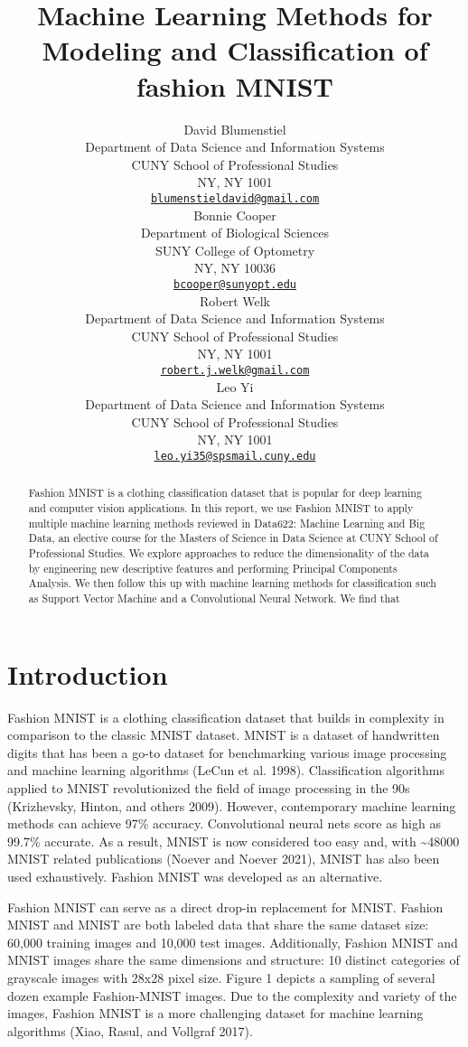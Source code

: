 \documentclass{article}
\title{Machine Learning Methods for Modeling and Classification of
fashion MNIST}
\author{
    David Blumenstiel
   \\
    Department of Data Science and Information Systems \\
    CUNY School of Professional Studies \\
  NY, NY 1001 \\
  \texttt{\href{mailto:blumenstieldavid@gmail.com}{\nolinkurl{blumenstieldavid@gmail.com}}} \\
   \And
    Bonnie Cooper
   \\
    Department of Biological Sciences \\
    SUNY College of Optometry \\
  NY, NY 10036 \\
  \texttt{\href{mailto:bcooper@sunyopt.edu}{\nolinkurl{bcooper@sunyopt.edu}}} \\
   \And
    Robert Welk
   \\
    Department of Data Science and Information Systems \\
    CUNY School of Professional Studies \\
  NY, NY 1001 \\
  \texttt{\href{mailto:robert.j.welk@gmail.com}{\nolinkurl{robert.j.welk@gmail.com}}} \\
   \And
    Leo Yi
   \\
    Department of Data Science and Information Systems \\
    CUNY School of Professional Studies \\
  NY, NY 1001 \\
  \texttt{\href{mailto:leo.yi35@spsmail.cuny.edu}{\nolinkurl{leo.yi35@spsmail.cuny.edu}}} \\
  }
\begin{document}
\maketitle

\def\tightlist{}


\begin{abstract}
Fashion MNIST is a clothing classification dataset that is popular for
deep learning and computer vision applications. In this report, we use
Fashion MNIST to apply multiple machine learning methods reviewed in
Data622: Machine Learning and Big Data, an elective course for the
Masters of Science in Data Science at CUNY School of Professional
Studies. We explore approaches to reduce the dimensionality of the data
by engineering new descriptive features and performing Principal
Components Analysis. We then follow this up with machine learning
methods for classification such as Support Vector Machine and a
Convolutional Neural Network. We find that
\end{abstract}


\hypertarget{introduction}{%
\section{Introduction}\label{introduction}}

Fashion MNIST is a clothing classification dataset that builds in
complexity in comparison to the classic MNIST dataset. MNIST is a
dataset of handwritten digits that has been a go-to dataset for
benchmarking various image processing and machine learning algorithms
(LeCun et al. 1998). Classification algorithms applied to MNIST
revolutionized the field of image processing in the 90s (Krizhevsky,
Hinton, and others 2009). However, contemporary machine learning methods
can achieve 97\% accuracy. Convolutional neural nets score as high as
99.7\% accurate. As a result, MNIST is now considered too easy and, with
\textasciitilde48000 MNIST related publications (Noever and Noever
2021), MNIST has also been used exhaustively. Fashion MNIST was
developed as an alternative.

Fashion MNIST can serve as a direct drop-in replacement for MNIST.
Fashion MNIST and MNIST are both labeled data that share the same
dataset size: 60,000 training images and 10,000 test images.
Additionally, Fashion MNIST and MNIST images share the same dimensions
and structure: 10 distinct categories of grayscale images with 28x28
pixel size. Figure 1 depicts a sampling of several dozen example
Fashion-MNIST images. Due to the complexity and variety of the images,
Fashion MNIST is a more challenging dataset for machine learning
algorithms (Xiao, Rasul, and Vollgraf 2017).
\end{document}
